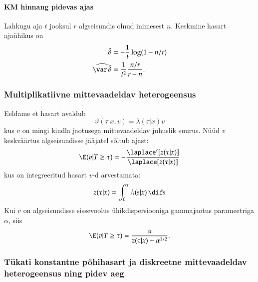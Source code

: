 \documentclass[a4paper]{article}
\numberwithin{equation}{subsection}
\begin{document}
\paragraph{KM hinnang pidevas ajas}
Lahkugu aja $t$ jooksul $r$ algseisundis olnud inimesest $n$.
Keskmine hasart ajaühikus on
\begin{align}
  \hat\vartheta &= -\frac{1}{t} \log(1 - n/r)\\
  \widehat{\var\hat\vartheta} &=
  \frac{1}{t^2} 
  \frac{n/r}{r - n}.
\end{align}




\subsubsection{Multiplikatiivne mittevaadeldav heterogeensus}

Eeldame et hasart avaldub
\begin{equation}
  \vartheta(\tau|x, v) = \lambda(\tau|x) v
\end{equation}
kus $v$ on mingi kindla jaotusega mittevaadeldav juhuslik suurus.
Nüüd $v$ keskväärtus algseisundisse jääjatel sõltub ajast:
\begin{equation}
  \E (v|T \ge \tau) =
  - \frac{\laplace'[z(\tau|x)]}{\laplace[z(\tau|x)]}
\end{equation}
kus on integreeritud hasart $v$-d arvestamata:
\begin{equation}
  z(\tau|x) = \int_0^\tau \lambda(s|x) \,\dif s
\end{equation}
Kui $v$ on algseisundisse sissevoolus ühikdispersiooniga gammajaotus
parameetriga $\alpha$, siis
\begin{equation}
  \E (v|T \ge \tau) =
  \frac{\alpha}{z(\tau|x) + \alpha^{1/2}}.
\end{equation}



\subsubsection[Tükati konstantne hasart]{Tükati konstantne põhihasart ja diskreetne
mittevaadeldav heterogeensus ning pidev aeg}
\label{sec:MPH_pcw}
\end{document}
